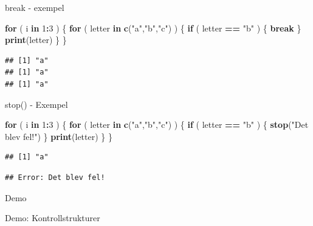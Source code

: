 \documentclass[
  11pt,
  ignorenonframetext,
]{beamer}
\newenvironment{Shaded}{\begin{snugshade}}{\end{snugshade}}
\newcommand{\ControlFlowTok}[1]{\textcolor[rgb]{0.13,0.29,0.53}{\textbf{#1}}}
\newcommand{\DecValTok}[1]{\textcolor[rgb]{0.00,0.00,0.81}{#1}}
\newcommand{\FunctionTok}[1]{\textcolor[rgb]{0.13,0.29,0.53}{\textbf{#1}}}
\newcommand{\NormalTok}[1]{#1}
\newcommand{\SpecialCharTok}[1]{\textcolor[rgb]{0.81,0.36,0.00}{\textbf{#1}}}
\newcommand{\StringTok}[1]{\textcolor[rgb]{0.31,0.60,0.02}{#1}}
\begin{document}
\begin{frame}[fragile]{break - exempel}
\label{break---exempel}
\begin{Shaded}
\begin{Highlighting}[]
\ControlFlowTok{for}\NormalTok{ ( i }\ControlFlowTok{in} \DecValTok{1}\SpecialCharTok{:}\DecValTok{3}\NormalTok{ ) \{}
  \ControlFlowTok{for}\NormalTok{ ( letter }\ControlFlowTok{in} \FunctionTok{c}\NormalTok{(}\StringTok{"a"}\NormalTok{,}\StringTok{"b"}\NormalTok{,}\StringTok{"c"}\NormalTok{) ) \{}
    \ControlFlowTok{if}\NormalTok{ ( letter }\SpecialCharTok{==} \StringTok{"b"}\NormalTok{ ) \{ }\ControlFlowTok{break}\NormalTok{ \}}
    \FunctionTok{print}\NormalTok{(letter)}
\NormalTok{  \}}
\NormalTok{\}}
\end{Highlighting}
\end{Shaded}

\pause

\begin{verbatim}
## [1] "a"
## [1] "a"
## [1] "a"
\end{verbatim}
\end{frame}

\begin{frame}[fragile]{stop() - Exempel}
\label{stop---exempel}
\begin{Shaded}
\begin{Highlighting}[]
\ControlFlowTok{for}\NormalTok{ ( i }\ControlFlowTok{in} \DecValTok{1}\SpecialCharTok{:}\DecValTok{3}\NormalTok{ ) \{}
  \ControlFlowTok{for}\NormalTok{ ( letter }\ControlFlowTok{in} \FunctionTok{c}\NormalTok{(}\StringTok{"a"}\NormalTok{,}\StringTok{"b"}\NormalTok{,}\StringTok{"c"}\NormalTok{) ) \{}
    \ControlFlowTok{if}\NormalTok{ ( letter }\SpecialCharTok{==} \StringTok{"b"}\NormalTok{ ) \{ }\FunctionTok{stop}\NormalTok{(}\StringTok{"Det blev fel!"}\NormalTok{) \}}
    \FunctionTok{print}\NormalTok{(letter)}
\NormalTok{  \}}
\NormalTok{\}}
\end{Highlighting}
\end{Shaded}

\pause

\begin{verbatim}
## [1] "a"
\end{verbatim}

\begin{verbatim}
## Error: Det blev fel!
\end{verbatim}
\end{frame}

\begin{frame}{Demo}
\label{demo-4}
\begin{block}{Demo: Kontrollstrukturer}
\label{demo-kontrollstrukturer}
\end{block}
\end{frame}
\end{document}
